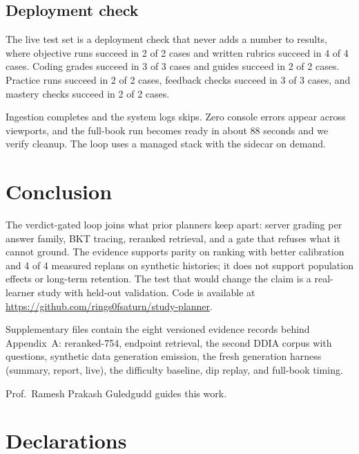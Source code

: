 \documentclass[sn-mathphys,Numbered]{sn-jnl}%
\theoremstyle{thmstyleone}%
\theoremstyle{thmstyletwo}%
\theoremstyle{thmstylethree}%
\begin{document}
\subsection{Deployment check}\label{subsec48}

The live test set is a deployment check that never adds a number to results, where objective runs succeed in 2 of 2 cases and written rubrics succeed in 4 of 4 cases. Coding grades succeed in 3 of 3 cases and guides succeed in 2 of 2 cases. Practice runs succeed in 2 of 2 cases, feedback checks succeed in 3 of 3 cases, and mastery checks succeed in 2 of 2 cases.

Ingestion completes and the system logs skips. Zero console errors appear across viewports, and the full-book run becomes ready in about 88 seconds and we verify cleanup. The loop uses a managed stack with the sidecar on demand.

\section{Conclusion}\label{sec5}

The verdict-gated loop joins what prior planners keep apart: server grading per answer family, BKT tracing, reranked retrieval, and a gate that refuses what it cannot ground. The evidence supports parity on ranking with better calibration and 4 of 4 measured replans on synthetic histories; it does not support population effects or long-term retention. The test that would change the claim is a real-learner study with held-out validation. Code is available at \url{https://github.com/rings0fsaturn/study-planner}.

\backmatter


Supplementary files contain the eight versioned evidence records behind Appendix~A: reranked-754, endpoint retrieval, the second DDIA corpus with questions, synthetic data generation emission, the fresh generation harness (summary, report, live), the difficulty baseline, dip replay, and full-book timing.


Prof.\ Ramesh Prakash Guledgudd guides this work.

\section*{Declarations}
\end{document}

